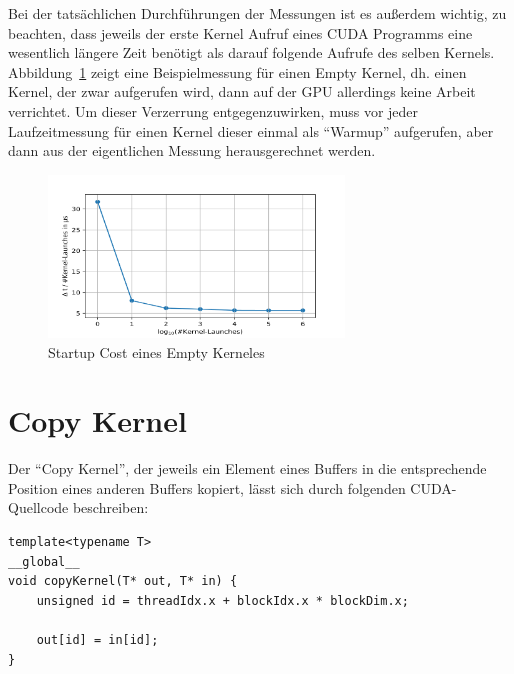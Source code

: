 \documentclass[11pt, abstract=on]{scrartcl}
\begin{document}
Bei der tatsächlichen Durchführungen der Messungen ist es außerdem wichtig, zu beachten, dass jeweils der erste Kernel Aufruf eines CUDA Programms eine wesentlich längere Zeit benötigt als darauf folgende Aufrufe des selben Kernels. Abbildung~\ref{fig:StartupCost} zeigt eine Beispielmessung für einen Empty Kernel, dh. einen Kernel, der zwar aufgerufen wird, dann auf der GPU allerdings keine Arbeit verrichtet. Um dieser Verzerrung entgegenzuwirken, muss vor jeder Laufzeitmessung für einen Kernel dieser einmal als "`Warmup"' aufgerufen, aber dann aus der eigentlichen Messung herausgerechnet werden.

\begin{figure} [htbp]
 	\centering
 		\includegraphics[width=0.7\textwidth]{Graph_Startup.png}
 	\caption{Startup Cost eines Empty Kerneles}
 	\label{fig:StartupCost}
\end{figure}

\section{Copy Kernel} \label{CopyKernel}

Der "`Copy Kernel"', der jeweils ein Element eines Buffers in die entsprechende Position eines anderen Buffers kopiert, lässt sich durch folgenden CUDA-Quellcode beschreiben:

\begin{lstlisting} 
template<typename T>
__global__
void copyKernel(T* out, T* in) {
	unsigned id = threadIdx.x + blockIdx.x * blockDim.x;
		
	out[id] = in[id];
}
\end{lstlisting}
\end{document}

